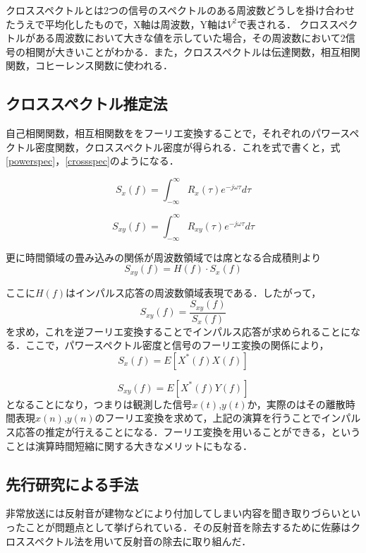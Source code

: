 \documentclass[a4j,11pt]{jsarticle}
\begin{document}
クロススペクトルとは2つの信号のスペクトルのある周波数どうしを掛け合わせたうえで平均化したもので，X軸は周波数，Y軸は$V^2$で表される．
クロススペクトルがある周波数において大きな値を示していた場合，その周波数において2信号の相関が大きいことがわかる．また，クロススペクトルは伝達関数，相互相関関数，コヒーレンス関数に使われる．\cite{oka6}
\subsection{クロススペクトル推定法}
自己相関関数，相互相関数ををフーリエ変換することで，それぞれのパワースペクトル密度関数，クロススペクトル密度が得られる．これを式で書くと，式\ref{powerspec}，\ref{crossspec}のようになる．

\begin{equation}
\label{powerspec}
  S_x(f) = \int^{\infty}_{-\infty} R_x(\tau)e^{-j\omega \tau}{d\tau}
\end{equation}

\begin{equation}
\label{crossspec}
  S_{xy}(f) = \int^{\infty}_{-\infty} R_{xy}(\tau)e^{-j\omega \tau}{d\tau}
\end{equation}

更に時間領域の畳み込みの関係が周波数領域では席となる合成積則より
\begin{equation}
\label{crossspec}
  S_{xy}(f) = H(f)\cdot S_x(f)
\end{equation}

ここに$H(f)$はインパルス応答の周波数領域表現である．したがって，
\begin{equation}
\label{crossspec}
  S_{xy}(f) = \frac {S_{xy}(f)}{S_x(f)}
\end{equation}
を求め，これを逆フーリエ変換することでインパルス応答が求められることになる．ここで，パワースペクトル密度と信号のフーリエ変換の関係により，
\begin{equation}
\label{crossspec}
  S_{x}(f) = E[X^{*}(f)X(f)]
\end{equation}

\begin{equation}
\label{crossspec}
  S_{xy}(f) = E[X^{*}(f)Y(f)]
\end{equation}
となることになり，つまりは観測した信号$x(t)$,$y(t)$か，実際のはその離散時間表現$x(n)$,$y(n)$のフーリエ変換を求めて，上記の演算を行うことでインパルス応答の推定が行えることになる．フーリエ変換を用いることができる，ということは演算時間短縮に関する大きなメリットにもなる．
\subsection{先行研究による手法}
非常放送には反射音が建物などにより付加してしまい内容を聞き取りづらいといったことが問題点として挙げられている．その反射音を除去するために佐藤はクロススペクトル法を用いて反射音の除去に取り組んだ．
\end{document}
